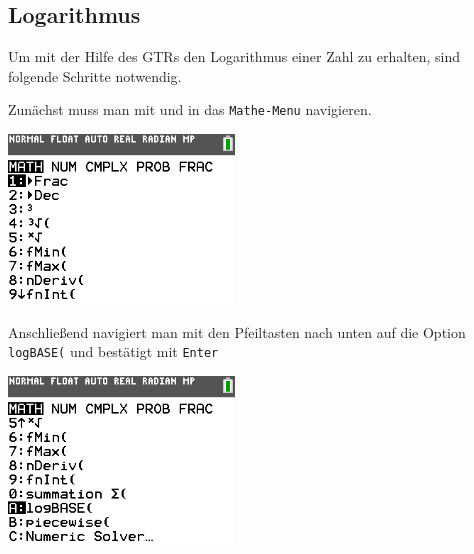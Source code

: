 \subsection{Logarithmus}
Um mit der Hilfe des GTRs den Logarithmus einer Zahl zu erhalten, sind folgende Schritte notwendig.
\begin{paracol}{2}
	\begin{flushleft}
	Zunächst muss man mit  und  in das \texttt{Mathe-Menu} navigieren.
	\end{flushleft}	
\switchcolumn
	\begin{flushright}
		\includegraphics[width=6cm]{Media/GRT/Visualisierung/logarithmus/log_1.png}
	\end{flushright}
\end{paracol}
\begin{paracol}{2}
	\begin{flushleft}
	Anschließend navigiert man mit den Pfeiltasten nach unten auf die Option \texttt{logBASE(} und bestätigt mit \texttt{Enter}
	\end{flushleft}	
\switchcolumn
	\begin{flushright}
		\includegraphics[width=6cm]{Media/GRT/Visualisierung/logarithmus/log_2.png}
	\end{flushright}
\end{paracol}
